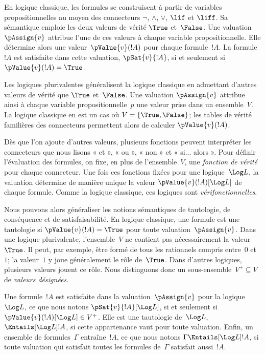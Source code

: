 \documentclass[../../../include/open-logic-section]{subfiles}
\begin{document}


En logique classique, les formules
se construisent à partir de variables
propositionnelles au moyen des connecteurs
$\lnot$, $\land$, $\lor$, $\lif$ et
$\liff$. Sa sémantique emploie les deux
valeurs de vérité $\True$ et~$\False$.
Une valuation~$\pAssign{v}$ attribue
l'une de ces valeurs à chaque variable
propositionnelle. Elle détermine alors
une valeur~$\pValue{v}(!A)$ pour chaque
formule~$!A$. La formule~$!A$ est
satisfaite dans cette valuation,
$\pSat{v}{!A}$, si et seulement si
$\pValue{v}(!A)=\True$.

Les logiques plurivalentes généralisent
la logique classique en admettant
d'autres valeurs de vérité que
$\True$ et~$\False$. Une valuation
$\pAssign{v}$ attribue ainsi à chaque
variable propositionnelle~$p$ une
valeur prise dans un ensemble~$V$.
La logique classique en est un cas
où $V=\{\True,\False\}$; les tables
de vérité familières des connecteurs
permettent alors de calculer
$\pValue{v}(!A)$.

Dès que l'on ajoute d'autres valeurs,
plusieurs fonctions peuvent
interpréter les connecteurs que nous
lisons « et », « ou », « non » et
« si... alors ». Pour définir l'évaluation des formules, on fixe,
en plus de l'ensemble~$V$, une \emph{fonction de vérité} pour
chaque connecteur. Une fois ces fonctions fixées pour une
logique~$\Log L$, la valuation détermine de manière unique la
valeur $\pValue{v}(!A)[\Log L]$ de chaque formule. Comme la
logique classique, ces logiques sont \emph{vérifonctionnelles}.

Nous pouvons alors généraliser les notions
sémantiques de tautologie, de conséquence
et de satisfaisabilité. En logique
classique, une formule est une tautologie
si $\pValue{v}(!A)=\True$ pour toute
valuation~$\pAssign{v}$. Dans une
logique plurivalente, l'ensemble~$V$
ne contient pas nécessairement la
valeur~$\True$. Il peut, par exemple,
être formé de tous les rationnels
compris entre~$0$ et~$1$; la valeur~$1$
y joue généralement le rôle de~$\True$.
Dans d'autres logiques, plusieurs
valeurs jouent ce rôle. Nous distinguons
donc un sous-ensemble~$V^+\subseteq V$
de \emph{valeurs désignées}.

Une formule~$!A$ est satisfaite dans
la valuation~$\pAssign{v}$ pour la
logique~$\Log L$, ce que nous notons
$\pSat{v}{!A}[\Log L]$, si et seulement
si $\pValue{v}(!A)[\Log L]\in V^+$.
Elle est une tautologie de~$\Log L$,
$\Entails[\Log L] !A$, si cette
appartenance vaut pour toute valuation.
Enfin, un ensemble de formules~$\Gamma$
entraîne~$!A$, ce que nous notons
$\Gamma\Entails[\Log L] !A$, si toute
valuation qui satisfait toutes les
formules de~$\Gamma$ satisfait aussi~$!A$.
\end{document}
